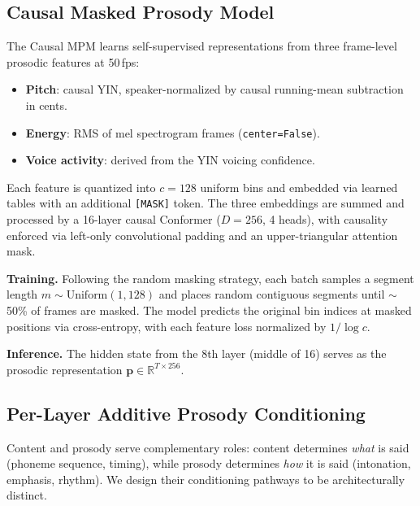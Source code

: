 \documentclass{article}
\begin{document}
\subsection{Causal Masked Prosody Model}
\label{ssec:mpm}

The Causal MPM learns self-supervised representations from three frame-level prosodic features at 50\,fps:
\begin{itemize}\itemsep0pt
    \item \textbf{Pitch}: causal YIN, speaker-normalized by causal running-mean subtraction in cents.
    \item \textbf{Energy}: RMS of mel spectrogram frames (\texttt{center=False}).
    \item \textbf{Voice activity}: derived from the YIN voicing confidence.
\end{itemize}

Each feature is quantized into $c = 128$ uniform bins and embedded via learned tables with an additional \texttt{[MASK]} token.
The three embeddings are summed and processed by a 16-layer causal Conformer ($D = 256$, 4 heads), with causality enforced via left-only convolutional padding and an upper-triangular attention mask.

\textbf{Training.}
Following the random masking strategy, each batch samples a segment length $m \sim \text{Uniform}(1, 128)$ and places random contiguous segments until ${\sim}$50\% of frames are masked.
The model predicts the original bin indices at masked positions via cross-entropy, with each feature loss normalized by $1/\log c$.

\textbf{Inference.}
The hidden state from the 8th layer (middle of 16) serves as the prosodic representation $\mathbf{p} \in \mathbb{R}^{T \times 256}$.

\subsection{Per-Layer Additive Prosody Conditioning}
\label{ssec:perlayer}

Content and prosody serve complementary roles: content determines \textit{what} is said (phoneme sequence, timing), while prosody determines \textit{how} it is said (intonation, emphasis, rhythm).
We design their conditioning pathways to be architecturally distinct.
\end{document}
